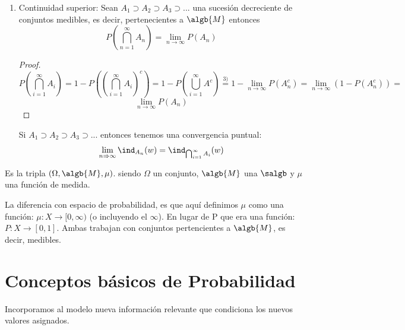 \documentclass{apuntes}
\begin{document}
\begin{enumerate}
\begin{proof}
Entonces:
\[P(\lim_{n \rightarrow \infty}A_n)=P(\bigcup_{n=1}^{\infty}A_n)=P(\bigcup_{n=1}^{\infty}D_n)=\sum_{n=1}^{\infty}P(D_n)=\lim_{n \rightarrow \infty}\sum_{i=1}^{n}P(D_i)=\lim_{n \rightarrow \infty}P(\bigcup_{i=1}^{n}D_i) =
\]
\[
=\lim_{n \rightarrow \infty}P(A_n)
\]
\end{proof}

\obs De esta propiedad podemos afirmar lo siguiente: \[ \bigcup_{n=1}^{\infty}A_n = \lim_{n \rightarrow \infty} A_n \Rightarrow P(\lim_{n \rightarrow \infty} A_n) = \lim_{n \rightarrow \infty} P(A_n)
\]
\obs Si $A_1 \subset A_2 \subset A_3 \subset...$ entonces tenemos una convergencia puntual:
\[
\lim_{n \Rightarrow \infty}\ind_{A_n}(w) = \ind_{\bigcup_{i=1}^{\infty}A_i}(w)
\]

\item Continuidad superior: Sean $A_1 \supset A_2 \supset A_3 \supset ...$ una sucesión decreciente de conjuntos medibles, es decir, pertenecientes a $\algb{M}$ entonces
\[ P(\bigcap_{n=1}^{\infty}A_n) = \lim_{n \rightarrow \infty} P(A_n)
\]

\begin{proof}
\[P(\bigcap_{i=1}^{\infty}A_i) = 1-P\left((\bigcap_{i=1}^{\infty}A_i)^c\right)=1-P(\bigcup_{i=1}^{\infty}A^c) \stackrel{3)}{=} 1-\lim_{n \rightarrow \infty}P(A_n^c)=\lim_{n \rightarrow \infty}(1-P(A_n^c)) =
\]
\[
\lim_{n \rightarrow \infty}P(A_n)
\]
\end{proof}

\obs Si $A_1 \supset A_2 \supset A_3 \supset...$ entonces tenemos una convergencia puntual:
\[
\lim_{n \Rightarrow \infty}\ind_{A_n}(w) = \ind_{\bigcap_{i=1}^{\infty}A_i}(w)
\]
\end{enumerate}


\begin{defn}
 Es la tripla $(\Omega, \algb{M}, \mu)$. siendo $\Omega$ un conjunto, $\algb{M}$ una $\salgb$ y $\mu$ una función de medida.
\end{defn}

La diferencia con espacio de probabilidad, es que aquí definimos $\mu$ como una función: $\mu: X \rightarrow [0,\infty)$  (o incluyendo el $\infty$). En lugar de P que era una función: $P: X \rightarrow [0,1]$. Ambas trabajan con conjuntos pertencientes a $\algb{M}$, es decir, medibles.


\section{Conceptos básicos de Probabilidad}
Incorporamos al modelo nueva información relevante que condiciona los nuevos valores asignados.
\end{document}
